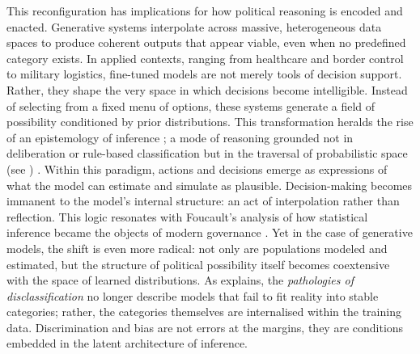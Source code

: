 This reconfiguration has implications for how political reasoning is encoded and enacted. Generative systems interpolate across massive, heterogeneous data spaces to produce coherent outputs that appear viable, even when no predefined category exists. In applied contexts, ranging from healthcare and border control to military logistics, fine-tuned models are not merely tools of decision support. Rather, they shape the very space in which decisions become intelligible. Instead of selecting from a fixed menu of options, these systems generate a field of possibility conditioned by prior distributions. This transformation heralds the rise of an epistemology of inference ; a mode of reasoning grounded not in deliberation or rule-based classification but in the traversal of probabilistic space (see \cite[4-6]{amoore2024}) . Within this paradigm, actions and decisions emerge as expressions of what the model can estimate and simulate as plausible. Decision-making becomes immanent to the model’s internal structure: an act of interpolation rather than reflection. This logic resonates with Foucault’s analysis of how statistical inference became the objects of modern governance \parencite[108--109]{foucault2009a}. Yet in the case of generative models, the shift is even more radical: not only are populations modeled and estimated, but the structure of political possibility itself becomes coextensive with the space of learned distributions. As \textcite[3-6]{amoore2024} explains, the \textit{pathologies of disclassification} no longer describe models that fail to fit reality into stable categories; rather, the categories themselves are internalised within the training data. Discrimination and bias are not errors at the margins, they are conditions embedded in the latent architecture of inference.


